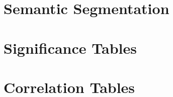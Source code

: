 \documentclass[pdftex]{pucthesis}	%
\begin{document}
\appendix %

\newpage
\section[Semantic Segmentation]{Semantic Segmentation}

\section[Significance Tables]{Significance Tables}\label{sec:sig_tables}

\section[Correlation Tables]{Correlation Tables}\label{sec:sig_tables}

\end{document}
